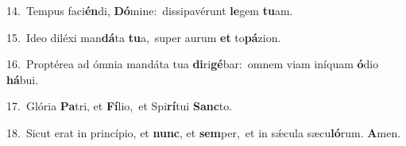 {\numbfont\textcolor{\numbcolor}{14.}}~Tempus faci\-\textbf{én}\-di, \textbf{Dó}\-mine:~\star dissipavérunt \textbf{le}\-gem \textbf{tu}\-am.\par
{\numbfont\textcolor{\numbcolor}{15.}}~Ideo diléxi man\-\textbf{dá}\-ta \textbf{tu}\-a,~\star super aurum \textbf{et} to\-\textbf{pá}\-zion.\par
{\numbfont\textcolor{\numbcolor}{16.}}~Proptérea ad ómnia mandáta tua \textbf{di}\-ri\-\textbf{gé}\-bar:~\star omnem viam iníquam \textbf{ó}\-dio \textbf{há}\-bui.\par
{\numbfont\textcolor{\numbcolor}{17.}}~Glória \textbf{Pa}\-tri, et \textbf{Fí}\-lio,~\star et Spi\-\textbf{rí}\-tui \textbf{Sanc}\-to.\par
{\numbfont\textcolor{\numbcolor}{18.}}~Sicut erat in princípio, et \textbf{nunc}\-, et \textbf{sem}\-per,~\star et in sǽcula sæcu\-\textbf{ló}\-rum. \textbf{A}\-men.\par
